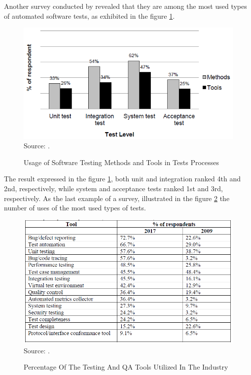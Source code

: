 Another survey conducted by \cite{lee2012survey} revealed that they are among the most used types of automated software tests, as exhibited in the figure \ref{fig:usage_stmt_tests_processes}.

\begin{figure}[H]
    \centering
    \caption{Usage of Software Testing Methods and Tools in Tests Processes}
    \includegraphics[width=0.8\linewidth]{figures/usage_stmt_tests_processes.png}
    \label{fig:usage_stmt_tests_processes}
    \\ \footnotesize Source: \cite{lee2012survey}.
\end{figure}

The result expressed in the figure \ref{fig:usage_stmt_tests_processes}, both unit and integration ranked 4th and 2nd, respectively, while system and acceptance tests ranked 1st and 3rd, respectively. As the last example of a survey, \cite{hynninen2023development} illustrated in the figure \ref{fig:testing_tools_2017_2009} the number of uses of the most used types of tests.

\begin{figure}[H]
    \centering
    \caption{Percentage Of The Testing And QA Tools Utilized In The Industry}
    \includegraphics[width=0.8\linewidth]{figures/testing_tools_2017_2009.png}
    \label{fig:testing_tools_2017_2009}
    \\ \footnotesize Source: \cite{hynninen2023development, kasurinen2010software}.
\end{figure}

